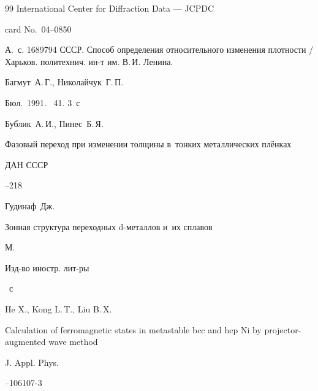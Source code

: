 \begin{thebibliography}{99}
\book International Center for Diffraction Data --- JCPDC


\finalinfo card No.~04--0850




\book А.~с. 1689794 СССР. Способ определения относительного изменения плотности / Харьков. политехнич. ин-т им. В.\,И. Ленина.

\by Багмут~А.\,Г., Николайчук~Г.\,П.

\bookinfo Бюл.~1991. \No~41. 3~с




\by Бублик~А.\,И., Пинес~Б.\,Я.

\paper Фазовый переход при изменении толщины в~тонких металлических плёнках

\jour ДАН СССР




--218






\by Гудинаф~Дж.

\book Зонная структура переходных d-металлов и~их сплавов

\publaddr М.

\publ Изд-во иностр. лит-ры


~с




\by He X., Kong L.\,T.,  Liu  B.\,X.

\paper Calculation of ferromagnetic states in metastable bcc and hcp Ni by projector-augmented wave method

\jour J. Appl. Phys.




--106107-3

\end{thebibliography}



\makeengtitle



% 

